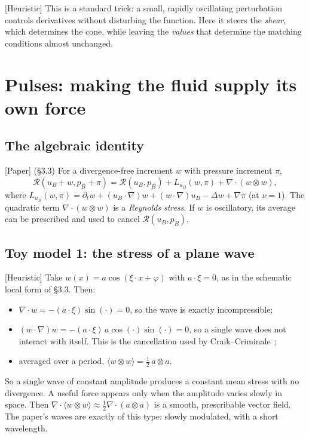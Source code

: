 \documentclass[11pt]{article}
\newcommand{\Res}{\mathcal{R}}
\newcommand{\avg}[1]{\langle #1\rangle}
\theoremstyle{plain}
\theoremstyle{remark}
\newcommand{\paper}{\textsf{\small[Paper]}}
\newcommand{\heur}{\textsf{\small[Heuristic]}}
\begin{document}
\heur{} This is a standard trick: a small, rapidly oscillating perturbation controls derivatives without disturbing the function. Here it steers the \emph{shear}, which determines the cone, while leaving the \emph{values} that determine the matching conditions almost unchanged.

\section{Pulses: making the fluid supply its own force}\label{sec:pulses}

\subsection{The algebraic identity}
\paper{} (\S3.3) For a divergence-free increment $w$ with pressure increment $\pi$,
\begin{equation}\label{eq:increment}
\Res(u_B+w,p_B+\pi)=\Res(u_B,p_B)+L_{u_B}(w,\pi)+\nabla\cdot(w\otimes w),
\end{equation}
where $L_{u_B}(w,\pi)=\partial_tw+(u_B\cdot\nabla)w+(w\cdot\nabla)u_B-\Delta w+\nabla\pi$ (at $\nu=1$). The quadratic term $\nabla\cdot(w\otimes w)$ is a \emph{Reynolds stress}. If $w$ is oscillatory, its average can be prescribed and used to cancel $\Res(u_B,p_B)$.

\subsection{Toy model 1: the stress of a plane wave}
\heur{} Take $w(x)=a\cos(\xi\cdot x+\varphi)$ with $a\cdot\xi=0$, as in the schematic local form of \S3.3. Then:
\begin{itemize}[itemsep=1pt]
\item $\nabla\cdot w=-(a\cdot\xi)\sin(\cdot)=0$, so the wave is exactly incompressible;
\item $(w\cdot\nabla)w=-(a\cdot\xi)\,a\cos(\cdot)\sin(\cdot)=0$, so a single wave does not interact with itself. This is the cancellation used by Craik--Criminale~\cite{CC};
\item averaged over a period, $\avg{w\otimes w}=\tfrac12\,a\otimes a$.
\end{itemize}
So a single wave of constant amplitude produces a constant mean stress with no divergence. A useful force appears only when the amplitude varies slowly in space. Then $\nabla\cdot\avg{w\otimes w}\approx\tfrac12\nabla\cdot(a\otimes a)$ is a smooth, prescribable vector field. The paper's waves are exactly of this type: slowly modulated, with a short wavelength.
\end{document}
